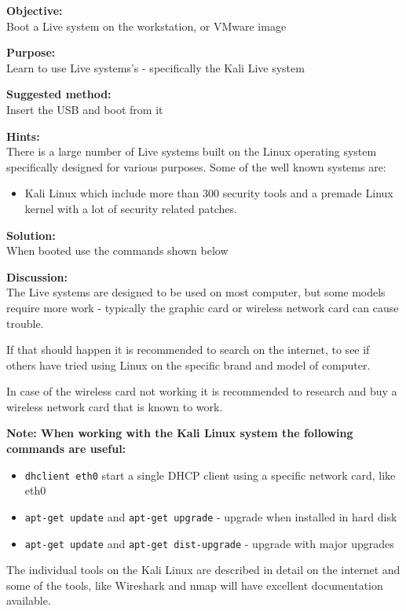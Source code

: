 \documentclass[a4paper,11pt,notitlepage]{report}
\begin{document}
{\bf Objective:}\\
Boot a Live system on the workstation, or VMware image

{\bf Purpose:}\\
Learn to use Live systems's - specifically the Kali Live system

{\bf Suggested method:}\\
Insert the USB and boot from it

{\bf Hints:}\\
There is a large number of Live systems built on the Linux operating system
specifically designed for various purposes. Some of the well known systems are:

\begin{itemize}
\item Kali Linux which include more than 300 security tools and a premade Linux kernel with a lot of security related patches.
\end{itemize}

{\bf Solution:}\\
When booted use the commands shown below

{\bf Discussion:}\\
The Live systems are designed to be used on most computer, but some models
require more work - typically the graphic card or wireless network card can cause trouble.

If that should happen it is recommended to search on the internet, to see if others have tried using Linux on the specific brand and model of computer.

In case of the wireless card not working it is recommended to research and buy
a wireless network card that is known to work.

{\bf Note: When working with the Kali Linux system the following commands are useful:}
\begin{itemize}
\item \verb+dhclient eth0+ start a single DHCP client using a specific network card, like eth0
\item \verb+apt-get update+ and \verb+apt-get upgrade+ - upgrade when installed in hard disk
\item \verb+apt-get update+ and \verb+apt-get dist-upgrade+ - upgrade with major upgrades
\end{itemize}

The individual tools on the Kali Linux are described in detail on the internet and some of the tools, like Wireshark and nmap will have excellent documentation available.
\end{document}
